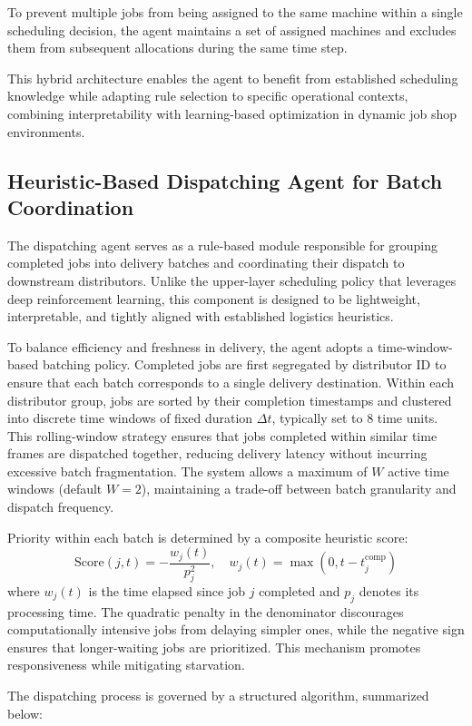 \documentclass{article}
\begin{document}
To prevent multiple jobs from being assigned to the same machine within a single scheduling decision, the agent maintains a set of assigned machines and excludes them from subsequent allocations during the same time step.

This hybrid architecture enables the agent to benefit from established scheduling knowledge while adapting rule selection to specific operational contexts, combining interpretability with learning-based optimization in dynamic job shop environments.

\subsection{Heuristic-Based Dispatching Agent for Batch Coordination}

The dispatching agent serves as a rule-based module responsible for grouping completed jobs into delivery batches and coordinating their dispatch to downstream distributors. Unlike the upper-layer scheduling policy that leverages deep reinforcement learning, this component is designed to be lightweight, interpretable, and tightly aligned with established logistics heuristics.

To balance efficiency and freshness in delivery, the agent adopts a time-window-based batching policy. Completed jobs are first segregated by distributor ID to ensure that each batch corresponds to a single delivery destination. Within each distributor group, jobs are sorted by their completion timestamps and clustered into discrete time windows of fixed duration $\Delta t$, typically set to 8 time units. This rolling-window strategy ensures that jobs completed within similar time frames are dispatched together, reducing delivery latency without incurring excessive batch fragmentation. The system allows a maximum of $W$ active time windows (default $W=2$), maintaining a trade-off between batch granularity and dispatch frequency.

Priority within each batch is determined by a composite heuristic score:
\[
\mathrm{Score}(j, t) = -\frac{w_j(t)}{p_j^2}, \quad w_j(t) = \max(0, t - t_j^{\text{comp}})
\]
where $w_j(t)$ is the time elapsed since job $j$ completed and $p_j$ denotes its processing time. The quadratic penalty in the denominator discourages computationally intensive jobs from delaying simpler ones, while the negative sign ensures that longer-waiting jobs are prioritized. This mechanism promotes responsiveness while mitigating starvation.

The dispatching process is governed by a structured algorithm, summarized below:
\end{document}
